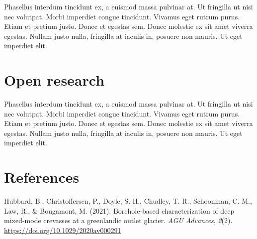 \documentclass[
]{agujournal2019}
\newlength{\cslhangindent}
\newenvironment{CSLReferences}[2] %
 {\begin{list}{}{%
  \setlength{\itemindent}{0pt}
  \setlength{\leftmargin}{0pt}
  \setlength{\parsep}{0pt}
  \ifodd #1
   \setlength{\leftmargin}{\cslhangindent}
   \setlength{\itemindent}{-1\cslhangindent}
  \fi
  \setlength{\itemsep}{#2\baselineskip}}}
 {\end{list}}
\begin{document}
Phasellus interdum tincidunt ex, a euismod massa pulvinar at. Ut
fringilla ut nisi nec volutpat. Morbi imperdiet congue tincidunt.
Vivamus eget rutrum purus. Etiam et pretium justo. Donec et egestas sem.
Donec molestie ex sit amet viverra egestas. Nullam justo nulla,
fringilla at iaculis in, posuere non mauris. Ut eget imperdiet elit.

\section{Open research}\label{open-research}

Phasellus interdum tincidunt ex, a euismod massa pulvinar at. Ut
fringilla ut nisi nec volutpat. Morbi imperdiet congue tincidunt.
Vivamus eget rutrum purus. Etiam et pretium justo. Donec et egestas sem.
Donec molestie ex sit amet viverra egestas. Nullam justo nulla,
fringilla at iaculis in, posuere non mauris. Ut eget imperdiet elit.

\section*{References}\label{references}

\label{refs}
\begin{CSLReferences}{1}{0}
\vspace{1em}

Hubbard, B., Christoffersen, P., Doyle, S. H., Chudley, T. R.,
Schoonman, C. M., Law, R., \& Bougamont, M. (2021). Borehole-based
characterization of deep mixed-mode crevasses at a greenlandic outlet
glacier. \emph{{AGU} Advances}, \emph{2}(2).
\url{https://doi.org/10.1029/2020av000291}

\end{CSLReferences}
\end{document}
